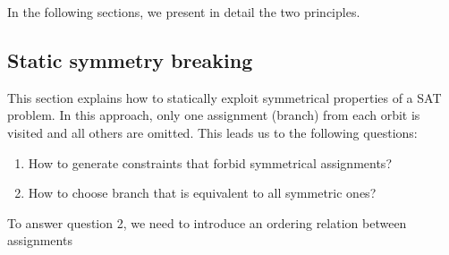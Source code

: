 In the following sections, we present in detail the two principles.

\subsection{Static symmetry breaking}

This section explains how to statically exploit symmetrical properties of a SAT problem.
In this approach, only one assignment (branch) from each orbit is visited and all others are
omitted.%
This leads us to the following questions:
\begin{enumerate}
 \item How to generate constraints that forbid symmetrical assignments?
 \item How  to choose branch that is equivalent to all symmetric ones?
\end{enumerate}
To answer question 2, we need to introduce an ordering relation between assignments

